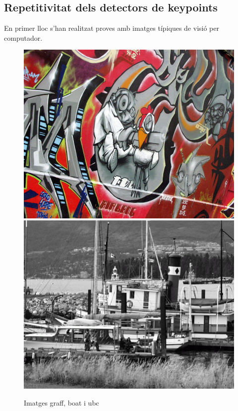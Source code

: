\subsection{Repetitivitat dels detectors de keypoints}
	En primer lloc s'han realitzat proves amb imatges típiques de visió per computador.
		\begin{figure}[!htb]
				\includegraphics[width=\linewidth]{images/experiments/graf3}
				\label{fig:awesome_image1}
			\endminipage\hfill
				\includegraphics[width=\linewidth]{images/experiments/boat}
				\label{fig:awesome_image2}
			\endminipage
			\caption{Imatges graff, boat i ubc}
		\end{figure}
